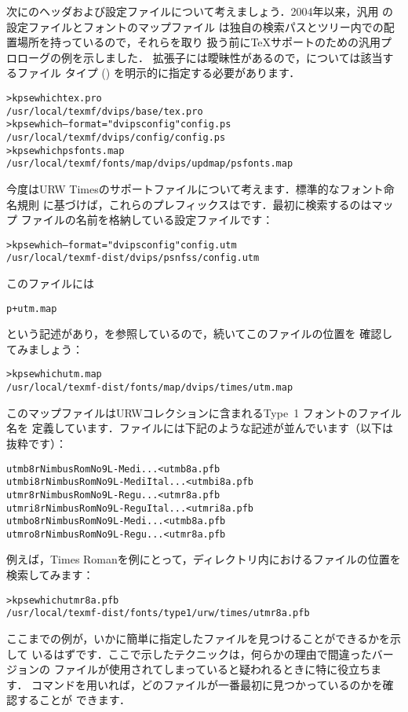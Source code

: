 \documentclass[uplatex,dvipdfmx,tombow]{jsarticle}
\begin{document}
次にのヘッダおよび設定ファイルについて考えましょう．2004年以来，汎用
の設定ファイルと\PS フォントのマップファイル%
は独自の検索パスとツリー内での配置場所を持っているので，それらを取り
扱う前に\TeX サポートのための汎用プロローグの例を示しました．
拡張子には曖昧性があるので，については該当するファイル
タイプ () を明示的に指定する必要があります．
%
\begin{alltt}
> kpsewhich tex.pro
   /usr/local/texmf/dvips/base/tex.pro
> kpsewhich --format="dvips config" config.ps
   /usr/local/texmf/dvips/config/config.ps
> kpsewhich psfonts.map
   /usr/local/texmf/fonts/map/dvips/updmap/psfonts.map
\end{alltt}

今度はURW Timesの\PS サポートファイルについて考えます．標準的なフォント命名規則
に基づけば，これらのプレフィックスはです．最初に検索するのはマップ
ファイルの名前を格納している設定ファイルです：
%
\begin{alltt}
> kpsewhich --format="dvips config" config.utm
   /usr/local/texmf-dist/dvips/psnfss/config.utm
\end{alltt}
%
このファイルには
%
\begin{alltt}
  p +utm.map
\end{alltt}
%
という記述があり，を参照しているので，続いてこのファイルの位置を
確認してみましょう：
%
\begin{alltt}
> kpsewhich utm.map
   /usr/local/texmf-dist/fonts/map/dvips/times/utm.map
\end{alltt}
%
このマップファイルはURWコレクションに含まれるType~1 \PS フォントのファイル名を
定義しています．ファイルには下記のような記述が並んでいます（以下は抜粋です）：
%
\begin{alltt}
utmb8r  NimbusRomNo9L-Medi    ... <utmb8a.pfb
utmbi8r NimbusRomNo9L-MediItal... <utmbi8a.pfb
utmr8r  NimbusRomNo9L-Regu    ... <utmr8a.pfb
utmri8r NimbusRomNo9L-ReguItal... <utmri8a.pfb
utmbo8r NimbusRomNo9L-Medi    ... <utmb8a.pfb
utmro8r NimbusRomNo9L-Regu    ... <utmr8a.pfb
\end{alltt}
%
例えば，Times Romanを例にとって，ディレクトリ内におけるファイルの位置を検索してみます：
%
\begin{alltt}
> kpsewhich utmr8a.pfb
   /usr/local/texmf-dist/fonts/type1/urw/times/utmr8a.pfb
\end{alltt}

ここまでの例が，いかに簡単に指定したファイルを見つけることができるかを示して
いるはずです．ここで示したテクニックは，何らかの理由で間違ったバージョンの
ファイルが使用されてしまっていると疑われるときに特に役立ちます．%
コマンドを用いれば，どのファイルが一番最初に見つかっているのかを確認することが
できます．
\end{document}
